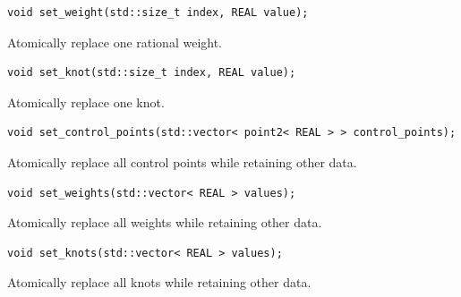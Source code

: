 \par\noindent\begin{minipage}{\linewidth}
\begin{lstlisting}[style=apireference]
void set_weight(std::size_t index, REAL value);
\end{lstlisting}
{\footnotesize Atomically replace one rational weight.\par}
\end{minipage}\par\vspace{1pt}
\par\noindent\begin{minipage}{\linewidth}
\begin{lstlisting}[style=apireference]
void set_knot(std::size_t index, REAL value);
\end{lstlisting}
{\footnotesize Atomically replace one knot.\par}
\end{minipage}\par\vspace{1pt}
\par\noindent\begin{minipage}{\linewidth}
\begin{lstlisting}[style=apireference]
void set_control_points(std::vector< point2< REAL > > control_points);
\end{lstlisting}
{\footnotesize Atomically replace all control points while retaining other data.\par}
\end{minipage}\par\vspace{1pt}
\par\noindent\begin{minipage}{\linewidth}
\begin{lstlisting}[style=apireference]
void set_weights(std::vector< REAL > values);
\end{lstlisting}
{\footnotesize Atomically replace all weights while retaining other data.\par}
\end{minipage}\par\vspace{1pt}
\par\noindent\begin{minipage}{\linewidth}
\begin{lstlisting}[style=apireference]
void set_knots(std::vector< REAL > values);
\end{lstlisting}
{\footnotesize Atomically replace all knots while retaining other data.\par}
\end{minipage}\par\vspace{1pt}
